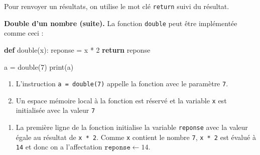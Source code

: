 \documentclass[a4paper,17pt]{extarticle}
\providecommand{\tightlist}{%
      \setlength{\itemsep}{0pt}\setlength{\parskip}{0pt}}
\newenvironment{Shaded}{}{}
\newcommand{\KeywordTok}[1]{\textcolor[rgb]{0.00,0.44,0.13}{\textbf{{#1}}}}
\newcommand{\DecValTok}[1]{\textcolor[rgb]{0.25,0.63,0.44}{{#1}}}
\newcommand{\NormalTok}[1]{{#1}}
\newcommand{\ControlFlowTok}[1]{\textcolor[rgb]{0.00,0.44,0.13}{\textbf{{#1}}}}
\newcommand{\OperatorTok}[1]{\textcolor[rgb]{0.40,0.40,0.40}{{#1}}}
\newcommand{\BuiltInTok}[1]{{#1}}
\begin{document}
    Pour renvoyer un résultats, on utilise le mot clé \texttt{return} suivi
du résultat.
\begin{exemple}
    \textbf{Double d'un nombre (suite).} La fonction \texttt{double} peut
être implémentée comme ceci :

\begin{Shaded}
\begin{Highlighting}[]
\KeywordTok{def}\NormalTok{ double(x):}
\NormalTok{    reponse }\OperatorTok{=}\NormalTok{ x }\OperatorTok{*} \DecValTok{2}
    \ControlFlowTok{return}\NormalTok{ reponse}

\NormalTok{a }\OperatorTok{=}\NormalTok{ double(}\DecValTok{7}\NormalTok{)}
\BuiltInTok{print}\NormalTok{(a)}
\end{Highlighting}
\end{Shaded}

\begin{enumerate}
\def\labelenumi{\arabic{enumi}.}
\tightlist
\item
  L'instruction \texttt{a\ =\ double(7)} appelle la fonction avec le
  paramètre \texttt{7}.
\item
  Un espace mémoire local à la fonction est réservé et la variable
  \texttt{x} est initialisée avec la valeur \texttt{7}
\end{enumerate}

\begin{center}
\end{center}

\begin{enumerate}
\def\labelenumi{\arabic{enumi}.}
\setcounter{enumi}{2}
\tightlist
\item
  La première ligne de la fonction initialise la variable
  \texttt{reponse} avec la valeur égale au résultat de \texttt{x\ *\ 2}.
  Comme \texttt{x} contient le nombre \texttt{7}, \texttt{x\ *\ 2} est
  évalué à \texttt{14} et donc on a l'affectation
  \(\texttt{reponse} \leftarrow 14\).
\end{enumerate}

\begin{center}
\end{center}


\end{exemple}
\end{document}
